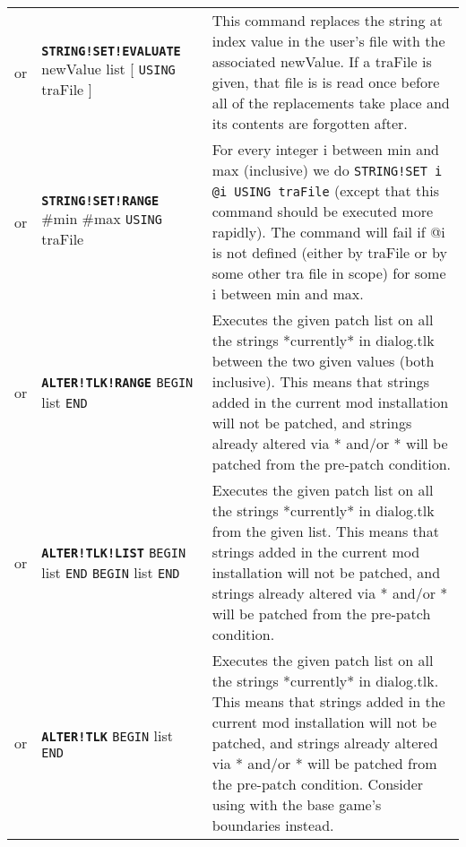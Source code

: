 \documentclass{article}
\def\ttref#1{\ahrefloc{#1}{\tt #1}}
\def\DEFINE#1{{\tt \bf #1}\label{#1}\index{#1}}
\def\t#1{{\tt #1}}
\def\Slist{{\color{red} list }}
\def\Ob{{\color{red} [ }}
\def\Oe{{\color{red} ] }}
\begin{document}
\begin{tabular}{cp{10in}|p{10in}}
  or & \DEFINE{STRING!SET!EVALUATE} \ttref{value} newValue \Slist
    \Ob \t{USING} traFile \Oe &
    This command replaces the string at index value in the user's \ttref{TLK} file
    with the associated newValue. If a
    traFile is given, that file is is read once before all of the
    replacements take place and its contents are forgotten after. \\

  or & \DEFINE{STRING!SET!RANGE} \#min \#max \t{USING} traFile &
    For every integer i between min and max (inclusive) we do
    \t{STRING!SET i @i USING traFile} (except that this command should be
    executed more rapidly). The command will fail if @i is not defined
    (either by traFile or by some other tra file in scope) for some i
    between min and max.  \\

	or & \DEFINE{ALTER!TLK!RANGE} \ttref{value} \ttref{value} \t{BEGIN} \ttref{patch} \Slist \t{END} &
		Executes the given patch list on all the strings *currently* in dialog.tlk between the
		two given values (both inclusive).
		This means that strings added in the current mod installation will not
		be patched, and strings already altered via \ttref{ALTER!TLK}* and/or \ttref{STRING!SET}*
		will be patched from the pre-patch condition.\\

or & \DEFINE{ALTER!TLK!LIST} \t{BEGIN} \ttref{value} \Slist \t{END} \t{BEGIN} \ttref{patch} \Slist \t{END} &
		Executes the given patch list on all the strings *currently* in dialog.tlk from the given list.
		This means that strings added in the current mod installation will not
		be patched, and strings already altered via \ttref{ALTER!TLK}* and/or \ttref{STRING!SET}*
		will be patched from the pre-patch condition. \\

	or & \DEFINE{ALTER!TLK} \t{BEGIN} \ttref{patch} \Slist \t{END} &
		Executes the given patch list on all the strings *currently* in dialog.tlk.
		This means that strings added in the current mod installation will not
		be patched, and strings already altered via \ttref{ALTER!TLK}* and/or \ttref{STRING!SET}*
		will be patched from the pre-patch condition. Consider using
		\ttref{ALTER!TLK!RANGE} with the base game's boundaries instead. \\


\end{tabular}
\end{document}
